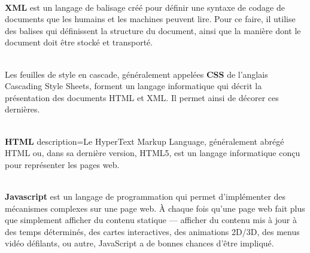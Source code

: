 \documentclass[12pt,oneside,noprintercorrection]{iut}
\begin{document}
 ~\\\indent \textbf{XML} est un langage de balisage créé pour définir une syntaxe de codage de documents que les humains et les machines peuvent lire. Pour ce faire, il utilise des balises qui définissent la structure du document, ainsi que la manière dont le document doit être stocké et transporté.\newline


     ~\\\indent Les feuilles de style en cascade, généralement appelées \textbf{CSS} de l'anglais Cascading Style Sheets, forment un langage informatique qui décrit la présentation des documents HTML et XML. Il permet ainsi de décorer ces dernières.\newline


     ~\\\indent \textbf{HTML}
    description=Le HyperText Markup Language, généralement abrégé HTML ou, dans sa dernière version, HTML5, est un langage informatique conçu pour représenter les pages web.\newline



     ~\\\indent \textbf{Javascript} est un langage de programmation qui permet d'implémenter des mécanismes complexes sur une page web. À chaque fois qu'une page web fait plus que simplement afficher du contenu statique — afficher du contenu mis à jour à des temps déterminés, des cartes interactives, des animations 2D/3D, des menus vidéo défilants, ou autre, JavaScript a de bonnes chances d'être impliqué.
\end{document}
